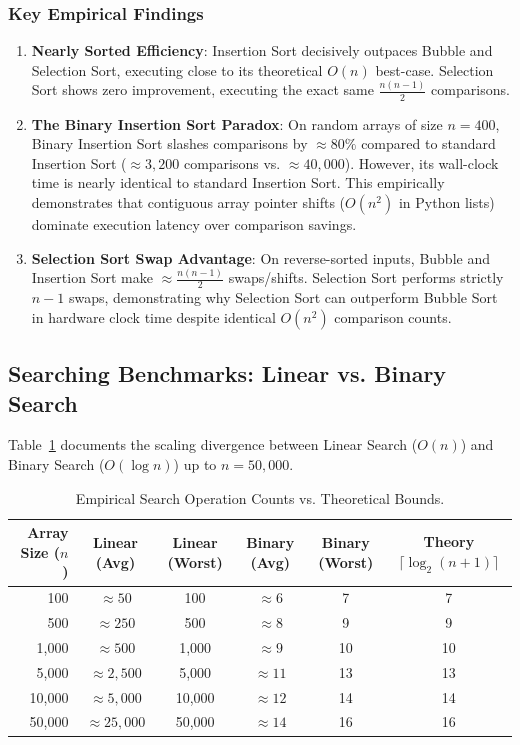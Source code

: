 \documentclass[11pt,a4paper]{article}
\theoremstyle{definition}
\theoremstyle{plain}
\theoremstyle{remark}
\begin{document}
\subsubsection{Key Empirical Findings}
\begin{enumerate}
    \item \textbf{Nearly Sorted Efficiency}: Insertion Sort decisively outpaces Bubble and Selection Sort, executing close to its theoretical $O(n)$ best-case. Selection Sort shows zero improvement, executing the exact same $\frac{n(n-1)}{2}$ comparisons.
    \item \textbf{The Binary Insertion Sort Paradox}: On random arrays of size $n = 400$, Binary Insertion Sort slashes comparisons by \textbf{$\approx 80\%$} compared to standard Insertion Sort ($\approx 3{,}200$ comparisons vs. $\approx 40{,}000$). However, its wall-clock time is nearly identical to standard Insertion Sort. This empirically demonstrates that contiguous array pointer shifts ($O(n^2)$ in Python lists) dominate execution latency over comparison savings.
    \item \textbf{Selection Sort Swap Advantage}: On reverse-sorted inputs, Bubble and Insertion Sort make $\approx \frac{n(n-1)}{2}$ swaps/shifts. Selection Sort performs strictly $n - 1$ swaps, demonstrating why Selection Sort can outperform Bubble Sort in hardware clock time despite identical $O(n^2)$ comparison counts.
\end{enumerate}

\subsection{Searching Benchmarks: Linear vs. Binary Search}
Table~\ref{tab:search_bench} documents the scaling divergence between Linear Search ($O(n)$) and Binary Search ($O(\log n)$) up to $n = 50{,}000$.

\begin{table}[htbp]
\centering
\caption{Empirical Search Operation Counts vs. Theoretical Bounds.}
\label{tab:search_bench}
\begin{tabularx}{0.9\textwidth}{r c c c c c}
\toprule
\textbf{Array Size ($n$)} & \textbf{Linear (Avg)} & \textbf{Linear (Worst)} & \textbf{Binary (Avg)} & \textbf{Binary (Worst)} & \textbf{Theory $\lceil \log_2(n+1) \rceil$} \\
\midrule
100    & $\approx 50$    & 100    & $\approx 6$  & 7  & 7 \\
500    & $\approx 250$   & 500    & $\approx 8$  & 9  & 9 \\
1,000  & $\approx 500$   & 1,000  & $\approx 9$  & 10 & 10 \\
5,000  & $\approx 2,500$ & 5,000  & $\approx 11$ & 13 & 13 \\
10,000 & $\approx 5,000$ & 10,000 & $\approx 12$ & 14 & 14 \\
50,000 & $\approx 25,000$& 50,000 & $\approx 14$ & 16 & 16 \\
\bottomrule
\end{tabularx}
\end{table}
\end{document}
